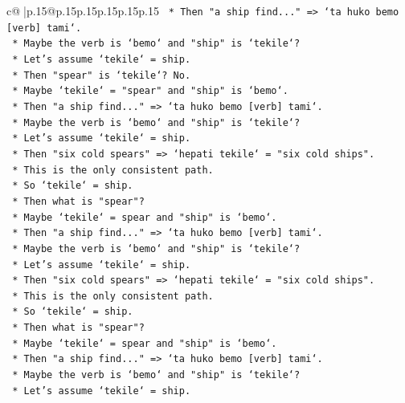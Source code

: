 \documentclass{article}
\begin{document}
{\begin{supertabular}{c@{$\;$}|p{.15\linewidth}@{}p{.15\linewidth}p{.15\linewidth}p{.15\linewidth}p{.15\linewidth}p{.15\linewidth}}
{{{\texttt{            *   Then "a ship find..." => `ta huko bemo {[}verb{]} tami`.} \\
\texttt{            *   Maybe the verb is `bemo` and "ship" is `tekile`?} \\
\texttt{            *   Let's assume `tekile` = ship.} \\
\texttt{            *   Then "spear" is `tekile`? No.} \\
\texttt{            *   Maybe `tekile` = "spear" and "ship" is `bemo`.} \\
\texttt{            *   Then "a ship find..." => `ta huko bemo {[}verb{]} tami`.} \\
\texttt{            *   Maybe the verb is `bemo` and "ship" is `tekile`?} \\
\texttt{            *   Let's assume `tekile` = ship.} \\
\texttt{            *   Then "six cold spears" => `hepati tekile` = "six cold ships".} \\
\texttt{            *   This is the only consistent path.} \\
\texttt{            *   So `tekile` = ship.} \\
\texttt{            *   Then what is "spear"?} \\
\texttt{            *   Maybe `tekile` = spear and "ship" is `bemo`.} \\
\texttt{            *   Then "a ship find..." => `ta huko bemo {[}verb{]} tami`.} \\
\texttt{            *   Maybe the verb is `bemo` and "ship" is `tekile`?} \\
\texttt{            *   Let's assume `tekile` = ship.} \\
\texttt{            *   Then "six cold spears" => `hepati tekile` = "six cold ships".} \\
\texttt{            *   This is the only consistent path.} \\
\texttt{            *   So `tekile` = ship.} \\
\texttt{            *   Then what is "spear"?} \\
\texttt{            *   Maybe `tekile` = spear and "ship" is `bemo`.} \\
\texttt{            *   Then "a ship find..." => `ta huko bemo {[}verb{]} tami`.} \\
\texttt{            *   Maybe the verb is `bemo` and "ship" is `tekile`?} \\
\texttt{            *   Let's assume `tekile` = ship.} \\
}}}
\end{supertabular}}
\end{document}
